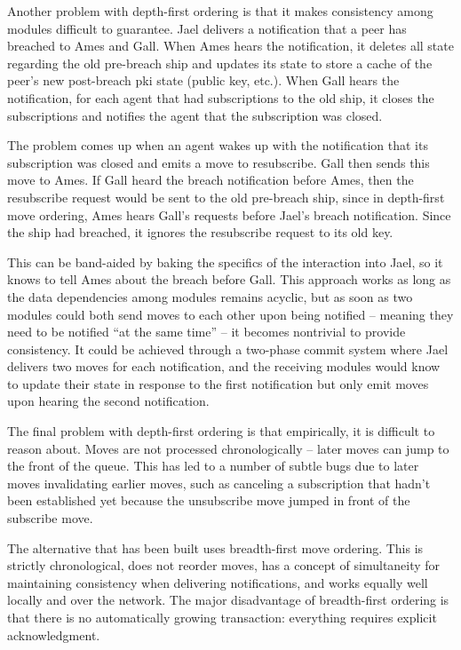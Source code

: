 \documentclass[twoside]{article}
\begin{document}
Another problem with depth-first ordering is that it makes consistency among modules difficult to guarantee.  Jael delivers a notification that a peer has breached to Ames and Gall.  When Ames hears the notification, it deletes all state regarding the old pre-breach ship and updates its state to store a cache of the peer's new post-breach {\sc pki} state (public key, etc.).  When Gall hears the notification, for each agent that had subscriptions to the old ship, it closes the subscriptions and notifies the agent that the subscription was closed.

The problem comes up when an agent wakes up with the notification that its subscription was closed and emits a move to resubscribe.  Gall then sends this move to Ames.  If Gall heard the breach notification before Ames, then the resubscribe request would be sent to the old pre-breach ship, since in depth-first move ordering, Ames hears Gall's requests before Jael's breach notification.  Since the ship had breached, it ignores the resubscribe request to its old key.

This can be band-aided by baking the specifics of the interaction into Jael, so it knows to tell Ames about the breach before Gall.  This approach works as long as the data dependencies among modules remains acyclic, but as soon as two modules could both send moves to each other upon being notified – meaning they need to be notified ``at the same time'' – it becomes nontrivial to provide consistency.  It could be achieved through a two-phase commit system where Jael delivers two moves for each notification, and the receiving modules would know to update their state in response to the first notification but only emit moves upon hearing the second notification.

The final problem with depth-first ordering is that empirically, it is difficult to reason about.  Moves are not processed chronologically – later moves can jump to the front of the queue.  This has led to a number of subtle bugs due to later moves invalidating earlier moves, such as canceling a subscription that hadn't been established yet because the unsubscribe move jumped in front of the subscribe move.

The alternative that has been built uses breadth-first move ordering.  This is strictly chronological, does not reorder moves, has a concept of simultaneity for maintaining consistency when delivering notifications, and works equally well locally and over the network.  The major disadvantage of breadth-first ordering is that there is no automatically growing transaction: everything requires explicit acknowledgment.
\end{document}
